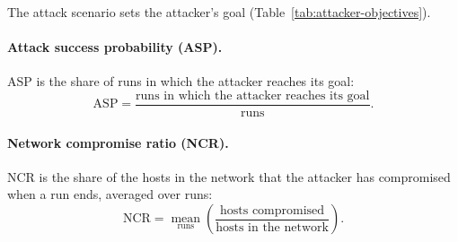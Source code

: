 \documentclass{cshonours}
\begin{document}
The attack scenario sets the attacker's goal
(Table~\ref{tab:attacker-objectives}).

\paragraph{Attack success probability (ASP).}
ASP \citep{cho2020} is the share of runs in which the attacker reaches
its goal:
\begin{equation}
  \mathrm{ASP} = \frac{\text{runs in which the attacker reaches its goal}}{\text{runs}}.
  \label{eq:asp}
\end{equation}

\paragraph{Network compromise ratio (NCR).}
NCR \citep{zhang2023} is the share of the hosts in the network that the
attacker has compromised when a run ends, averaged over runs:
\begin{equation}
  \mathrm{NCR} = \operatorname*{mean}_{\text{runs}}
  \left( \frac{\text{hosts compromised}}{\text{hosts in the network}} \right).
  \label{eq:ncr}
\end{equation}
\end{document}
